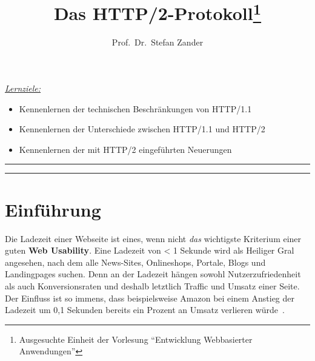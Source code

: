 \documentclass[a4paper, justified, notoc]{tufte-handout} %
\title{Das HTTP/2-Protokoll\thanks{Ausgesuchte Einheit der Vorlesung ``Entwicklung Webbasierter Anwendungen''}}
\author[opt Author]{Prof.\ Dr.\ Stefan Zander}
\newenvironment{lernziele}{
	\begin{mdframed}[hidealllines=true,backgroundcolor=gray!20] 
	\small \itshape
	\noindent \underline{Lernziele:} 
	} 
	{ 
	\end{mdframed}
}
\begin{document}
\maketitle%


\begin{lernziele}
\begin{itemize}
	\item Kennenlernen der technischen Beschränkungen von HTTP/1.1
	\item Kennenlernen der Unterschiede zwischen HTTP/1.1 und HTTP/2
	\item Kennenlernen der mit HTTP/2 eingeführten Neuerungen 
\end{itemize}
\end{lernziele}


\setcounter{secnumdepth}{2} %

\noindent \rule{1.54\textwidth}{0.4pt}
\tableofcontents
\noindent \rule{1.54\textwidth}{0.4pt}

\section{Einführung}\label{sec:introduction}

Die Ladezeit einer Webseite ist eines, wenn nicht \emph{das} wichtigste Kriterium einer guten \textbf{Web Usability}. Eine Ladezeit von < 1 Sekunde wird als Heiliger Gral angesehen, nach dem alle News-Sites, Onlineshops, Portale, Blogs und Landingpages suchen. Denn an der Ladezeit hängen sowohl Nutzerzufriedenheit als auch Konversionsraten und deshalb letztlich Traffic und Umsatz einer Seite. Der Einfluss ist so immens, dass beispielsweise Amazon bei einem Anstieg der Ladezeit um 0,1 Sekunden bereits ein Prozent an Umsatz verlieren würde~\citep{heise:2018}.
\end{document}
